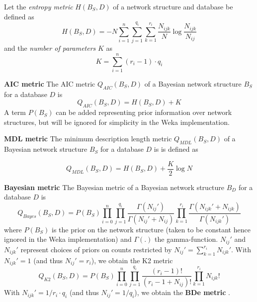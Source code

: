 \documentclass{article}
\begin{document}
Let the {\em entropy metric} $H(B_S,D)$ of a network structure and database
be defined as
\begin{equation}\label{eq.H}
 H(B_S,D)=-N\sum_{i=1}^n\sum_{j=1}^{q_i}\sum_{k=1}^{r_i}\frac{N_{ijk}}{N}\log\frac{N_{ijk}}{N_{ij}}
\end{equation}
and the {\em number of parameters} $K$ as
\begin{equation}\label{eq.K}
K=\sum_{i=1}^n(r_i-1)\cdot q_i
\end{equation}

{\bf AIC metric} The AIC metric $Q_{AIC}(B_S,D)$ of a Bayesian network
structure $B_S$ for a database $D$ is
\begin{equation}\label{eq.AIC}
Q_{AIC}(B_S,D) = H(B_S,D)+K
\end{equation}
A term $P(B_S)$ can be added \cite{bouck1995} representing prior
information  over network structures, but will be ignored for
simplicity in the Weka implementation.


{\bf MDL metric} 
The minimum description length metric $Q_{MDL}(B_S,D)$
of a Bayesian network structure $B_S$ for a database $D$ is
is defined as

\begin{equation}\label{eq.MDL}
Q_{MDL}(B_S,D) = H(B_S,D)+\frac{K}{2}\log N
\end{equation}

{\bf Bayesian metric}
The Bayesian metric of a Bayesian network structure $B_D$ for a database $D$ is
$$
Q_{Bayes}(B_S,D) = P(B_S)\prod_{i=0}^n\prod_{j=1}^{q_i}\frac{\Gamma(N_{ij}')}{\Gamma(N_{ij}'+N_{ij})}
\prod_{k=1}^{r_i}\frac{\Gamma(N_{ijk}'+N_{ijk})}{\Gamma(N_{ijk}')}
$$
where $P(B_S)$ is the prior on the network structure (taken to be constant hence ignored 
in the Weka implementation) and $\Gamma(.)$ the gamma-function. $N_{ij}'$ and $N_{ijk}'$
represent choices of priors on counts restricted by 
$N_{ij}'=\sum_{k=1}^{r_i}N_{ijk}'$. With $N_{ijk}'=1$ (and thus $N_{ij}'=r_i$), 
we obtain the K2 metric \cite{CooperHerskovits1992}
$$
Q_{K2}(B_S,D) = P(B_S)\prod_{i=0}^n\prod_{j=1}^{q_i}\frac{(r_i-1)!}{(r_i-1+N_{ij})!}
\prod_{k=1}^{r_i}N_{ijk}!
$$
With $N_{ijk}'=1/r_i\cdot q_i$ (and thus $N_{ij}'=1/q_i$), we obtain the {\bf BDe metric}
\cite{heckerman95}.
\end{document}
